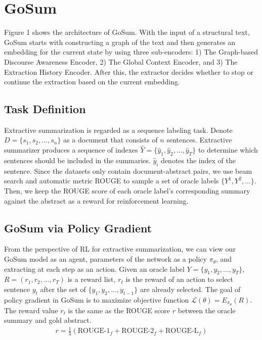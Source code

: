 \documentclass[11pt,a4paper]{article}
\begin{document}
\section{GoSum }
\label{sec:method}

Figure 1 shows the architecture of GoSum. With the input of a structural text,  GoSum starts with constructing a  graph of the text
and then generates  an embedding for the current state by using three sub-encoders: 1) The Graph-based Discourse Awareness Encoder, 2) The Global Context Encoder, and 3) The Extraction History Encoder. After this, the extractor decides whether to stop or continue the extraction based on the current embedding. 


\subsection{Task Definition}
Extractive summarization is regarded as a sequence labeling task.
Denote $D=\{s_1,s_2,...,s_n\}$ as a document that consists of $n$ sentences. Extractive summarizer produces a sequence of indexes $\hat{Y} = \{\hat{y}_1,\hat{y}_2,...,\hat{y}_T\}$ to determine which sentences should be included in the summaries.
$\hat{y}_i$ denotes the index of the sentence.
Since the datasets only contain document-abstract pairs, we use beam search and automatic metric ROUGE to sample a set of oracle labels $\{Y^1,Y^2,...\}$.
Then, we keep the ROUGE score of each oracle label's corresponding summary against the abstract as a reward for reinforcement learning.

\subsection{GoSum via Policy Gradient}
From the perspective of RL for extractive summarization, we can view our GoSum model  as an agent, parameters of the network as a policy $\pi_{\theta}$, and  extracting at each step  as an action.
Given an oracle label $Y = \{y_1,y_2,...,y_T\}$, $R=(r_1,r_2,...,r_T)$ is a reward list, $r_t$ is the reward of an action to select sentence $y_t$ after the set of $\{y_1,y_2,...,y_{t-1}\}$ are already selected.
The goal of policy gradient in GoSum is to maximize objective function $\mathcal{L}(\theta)=E_{\pi_{\theta}} (R)$.
The reward value $r_t$ is the same as the ROUGE \cite{rouge_2004} score $r$ between the oracle summary and gold abstract.
\begin{align}
    r = \frac{1}{3} \left(  \text{ROUGE-1}_f + \text{ROUGE-2}_f + \text{ROUGE-L}_f  \right)
\end{align}
\end{document}
